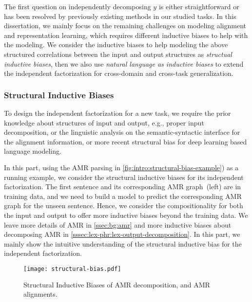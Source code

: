 {The first question on independently decomposing $y$ is either
straightforward or has been resolved by previously existing methods in
our studied tasks. In this dissertation, we mainly focus on the remaining
challenges on modeling alignment and representation learning, which
requires different inductive biases to help with the
modeling. We consider the inductive biases to
help modeling the above structured correlations between the input and
output structures as \emph{structual inductive biases}, then we also
use \emph{natural language as inductive biases} to extend the
independent factorization for cross-domain and cross-task
generalization.

\subsubsection{Structural Inductive Biases}
\label{sssec:intro:structural-biases}
To design the independent factorization for a new task, we require the
prior knowledge about structures of input and output, e.g., proper
input decomposition, or the linguistic analysis on the
semantic-syntactic interface for the alignment information, or more
recent structural bias for deep learning based language modeling.

In this part, using the AMR parsing in
\autoref{fig:intro:structural-bias-example}) as a running example, we
consider the structural inductive biases for its independent
factorization. The first sentence and its corresponding AMR
graph~(left) are in training data, and we need to build a model to
predict the corresponding AMR graph for the unseen sentence. Hence, we
consider the compositionality for both the input and output to offer
more inductive biases beyond the training data. We leave more details
of AMR in \autoref{ssec:bg:amr} and more inductive biases about
decomposing AMR in
\autoref{sssec:lex-phr:lex-output-decomposition}. In this part, we
mainly show the intuitive understanding of the structural inductive
bias for the independent factorization.

\begin{figure}[!tbp]
  \centering
  \texttt{[image: structural-bias.pdf]}
  \caption{\label{fig:intro:structural-bias-example} Structural Inductive
    Biases of AMR decomposition, and AMR alignments.}
\end{figure}

}
